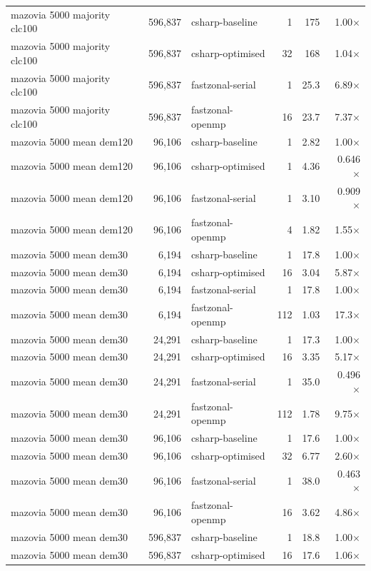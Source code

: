 \begin{tabular}{lrlrrr}
mazovia 5000 majority clc100 & 596,837 & csharp-baseline & 1 & 175 & 1.00$\times$ \\
mazovia 5000 majority clc100 & 596,837 & csharp-optimised & 32 & 168 & 1.04$\times$ \\
mazovia 5000 majority clc100 & 596,837 & fastzonal-serial & 1 & 25.3 & 6.89$\times$ \\
mazovia 5000 majority clc100 & 596,837 & fastzonal-openmp & 16 & 23.7 & 7.37$\times$ \\
mazovia 5000 mean dem120 & 96,106 & csharp-baseline & 1 & 2.82 & 1.00$\times$ \\
mazovia 5000 mean dem120 & 96,106 & csharp-optimised & 1 & 4.36 & 0.646$\times$ \\
mazovia 5000 mean dem120 & 96,106 & fastzonal-serial & 1 & 3.10 & 0.909$\times$ \\
mazovia 5000 mean dem120 & 96,106 & fastzonal-openmp & 4 & 1.82 & 1.55$\times$ \\
mazovia 5000 mean dem30 & 6,194 & csharp-baseline & 1 & 17.8 & 1.00$\times$ \\
mazovia 5000 mean dem30 & 6,194 & csharp-optimised & 16 & 3.04 & 5.87$\times$ \\
mazovia 5000 mean dem30 & 6,194 & fastzonal-serial & 1 & 17.8 & 1.00$\times$ \\
mazovia 5000 mean dem30 & 6,194 & fastzonal-openmp & 112 & 1.03 & 17.3$\times$ \\
mazovia 5000 mean dem30 & 24,291 & csharp-baseline & 1 & 17.3 & 1.00$\times$ \\
mazovia 5000 mean dem30 & 24,291 & csharp-optimised & 16 & 3.35 & 5.17$\times$ \\
mazovia 5000 mean dem30 & 24,291 & fastzonal-serial & 1 & 35.0 & 0.496$\times$ \\
mazovia 5000 mean dem30 & 24,291 & fastzonal-openmp & 112 & 1.78 & 9.75$\times$ \\
mazovia 5000 mean dem30 & 96,106 & csharp-baseline & 1 & 17.6 & 1.00$\times$ \\
mazovia 5000 mean dem30 & 96,106 & csharp-optimised & 32 & 6.77 & 2.60$\times$ \\
mazovia 5000 mean dem30 & 96,106 & fastzonal-serial & 1 & 38.0 & 0.463$\times$ \\
mazovia 5000 mean dem30 & 96,106 & fastzonal-openmp & 16 & 3.62 & 4.86$\times$ \\
mazovia 5000 mean dem30 & 596,837 & csharp-baseline & 1 & 18.8 & 1.00$\times$ \\
mazovia 5000 mean dem30 & 596,837 & csharp-optimised & 16 & 17.6 & 1.06$\times$ \\

\end{tabular}
